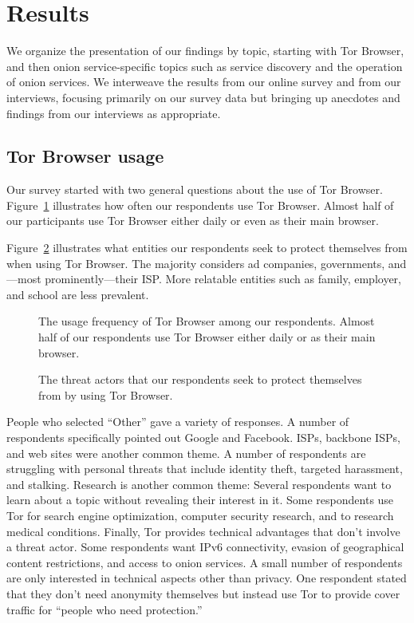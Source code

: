 \section{Results}
\label{sec:results}

We organize the presentation of our findings by topic, starting with Tor
Browser, and then onion service-specific topics such as service discovery and
the operation of onion services.  We interweave the results from our online
survey and from our interviews, focusing primarily on our survey data but
bringing up anecdotes and findings from our interviews as appropriate.

\subsection{Tor Browser usage}

Our survey started with two general questions about the use of Tor Browser.
Figure~\ref{fig:tor-usage} illustrates how often our respondents use Tor
Browser.  Almost half of our participants use Tor Browser either daily or even
as their main browser.

Figure~\ref{fig:tor-threats} illustrates what entities our respondents seek to
protect themselves from when using Tor Browser.  The majority considers ad
companies, governments, and---most prominently---their ISP.  More relatable
entities such as family, employer, and school are less prevalent.

\begin{figure}[t]
    \centering
    
    \caption{The usage frequency of Tor Browser among our respondents.  Almost
    half of our respondents use Tor Browser either daily or as their main
    browser.}
    \label{fig:tor-usage}
\end{figure}

\begin{figure}[t]
    \centering
    
    \caption{The threat actors that our respondents seek to protect themselves
        from by using Tor Browser.}
    \label{fig:tor-threats}
\end{figure}

People who selected ``Other'' gave a variety of responses.  A number of
respondents specifically pointed out Google and Facebook.  ISPs, backbone ISPs,
and web sites were another common theme.  A number of respondents are struggling
with personal threats that include identity theft, targeted harassment, and
stalking.  Research is another common theme: Several respondents want to learn
about a topic without revealing their interest in it.  Some respondents use Tor
for search engine optimization, computer security research, and to research
medical conditions.  Finally, Tor provides technical advantages that don't
involve a threat actor.  Some respondents want IPv6 connectivity, evasion of
geographical content restrictions, and access to onion services.  A small number
of respondents are only interested in technical aspects other than privacy.  One
respondent stated that they don't need anonymity themselves but instead use Tor
to provide cover traffic for ``people who need protection.''

